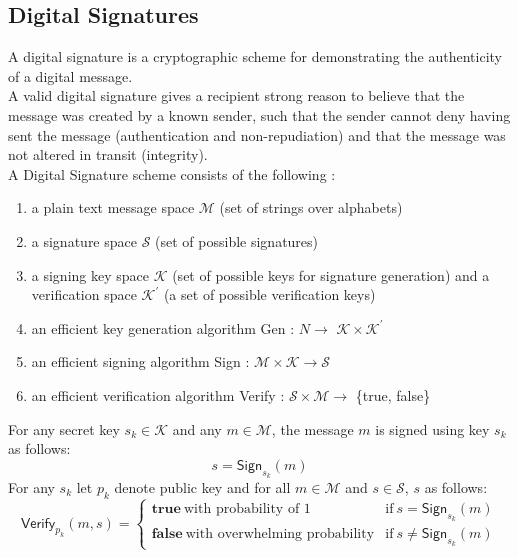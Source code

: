 \documentclass[%
  slidesonly,%
  semlayer%
  ]{seminar}                                  %
\begin{document}
\begin{slide}
  \subsection*{Digital Signatures}
    A digital signature is a cryptographic scheme for demonstrating the authenticity of a digital message.\\
    A valid digital signature gives a recipient strong reason to believe that the message was created by a known sender, such that the sender cannot deny having sent the message (authentication and non-repudiation) and that the message was not altered in transit (integrity).\\
    A Digital Signature scheme consists of the following :
    \begin{enumerate}
      \item a plain text message space $\mathcal{M}$ (set of strings over alphabets)
      \item a signature space $\mathcal{S}$ (set of possible signatures)
      \item a signing key space $\mathcal{K}$ (set of possible keys for signature generation) and a verification space $\mathcal{K^{'}}$ (a set of possible verification keys)
      \item an efficient key generation algorithm \textsf{Gen} : $N \rightarrow$ $\mathcal{K} \times \mathcal{K^{'}} $ 
      \item an efficient signing algorithm \textsf{Sign} : $ \mathcal{M} \times \mathcal{K} \rightarrow \mathcal{S}$
      \item an efficient verification algorithm \textsf{Verify} : $\mathcal{S} \times \mathcal{M} \rightarrow$ \{true, false\} 
    \end{enumerate}
    For any secret key $s_{k} \in \mathcal{K}$ and any $m \in \mathcal{M}$, the message $m$ is signed using key $s_{k}$ as follows:
      \begin{equation}
        s = \textsf{Sign}_{s_{k}}(m)
        \label{eq:signature}
      \end{equation}
    For any $s_{k}$ let $p_{k}$ denote public key and for all $m \in \mathcal{M}$ and $s \in \mathcal{S}$, $s$ as follows:
    \begin{equation}
      \textsf{Verify}_{p_{k}}(m,s) = 
      \begin{cases}
       \textbf{true}\ \mbox{with probability of 1} & \mbox{if}\ s = \textsf{Sign}_{s_{k}}(m)\\
       \textbf{false}\ \mbox{with overwhelming probability} & \mbox{if}\ s \neq \textsf{Sign}_{s_{k}}(m)

\end{cases}
\end{equation}
\end{slide}
\end{document}
